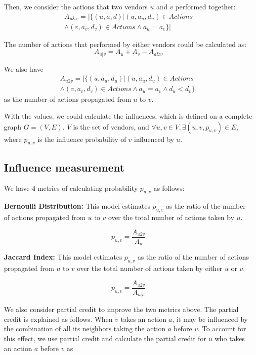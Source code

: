 Then, we consider the actions that two vendors $u$ and $v$ performed together: 
\begin{multline}
A_{u\&v} = |\{(u, a, d) | (u, a_u, d_u) \in Actions \\ \land (v, a_v, d_v) \in Actions \land a_u=a_v \}|
\end{multline}

The number of actions that performed by either vendors could be calculated as: 
\begin{equation}
A_{u|v} = A_u+A_v-A_{a\&v}
\end{equation}

We also have 
\begin{multline}
A_{u2v} = |\{(u, a_u, d_u) | (u, a_u, d_u) \in Actions \\ \land (v, a_v, d_v) \in Actions \land a_u=a_v \land d_u<d_v \}|
\end{multline}
 as the number of actions propagated from $u$ to $v$. 

With the values, we could calculate the influences, which is defined on a complete graph $G= (V,E)$. $V$ is the set of vendors, and $\forall u,v \in V, \exists (u,v,p_{u,v}) \in E$, where 
$p_{u,v}$ is the influence probability of $v$ influenced by $u$. 

\subsection{Influence measurement}
We have 4 metrics of calculating probability $p_{u,v}$ as follows:

\textbf{Bernoulli Distribution:} This model estimates $p_{u,v}$ as the ratio of the number of actions propagated from $u$ to $v$ over the total number of actions taken by $u$.

\begin{equation}
p_{u,v} = \frac{A_{u2v}}{A_u}
\end{equation}

\textbf{Jaccard Index:} This model estimates $p_{u,v}$ as the ratio of the number of actions propagated from $u$ to $v$ over the total number of actions taken by either $u$ or $v$.

\begin{equation}
p_{u,v} = \frac{A_{u2v}}{A_{u|v}}
\end{equation}

We also consider partial credit to improve the two metrics above.
The partial credit is explained as follows. When $v$ takes an action $a$, it may be influenced by the combination of all its neighbors taking the action $a$ before $v$. To account for this effect, we use partial credit and calculate the partial credit for $u$ who takes an action $a$ before $v$ as


